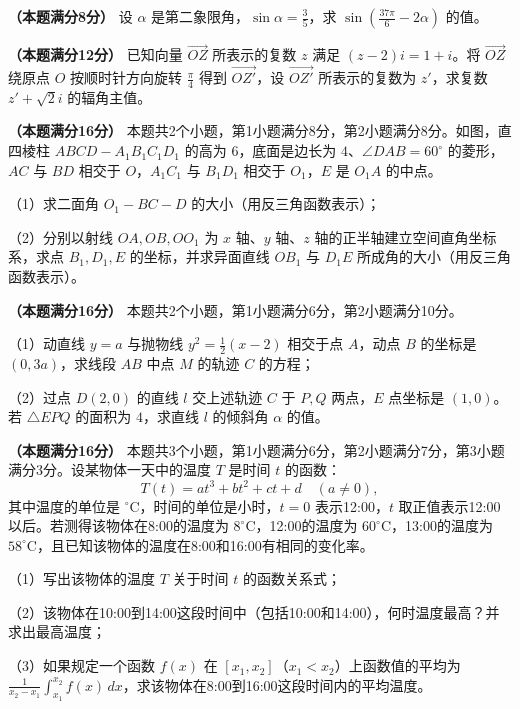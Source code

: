 \begin{question}
\textbf{（本题满分8分）} 设 $\alpha$ 是第二象限角，$\sin\alpha=\frac35$，求 $\sin\left(\frac{37\pi}{6}-2\alpha\right)$ 的值。

\end{question}
\begin{question}
\textbf{（本题满分12分）} 已知向量 $\overrightarrow{OZ}$ 所表示的复数 $z$ 满足 $(z-2)i=1+i$。将 $\overrightarrow{OZ}$ 绕原点 $O$ 按顺时针方向旋转 $\frac\pi4$ 得到 $\overrightarrow{OZ'}$，设 $\overrightarrow{OZ'}$ 所表示的复数为 $z'$，求复数 $z'+\sqrt2 i$ 的辐角主值。

\Needspace{0.4\textheight}
\end{question}
\begin{question}
\textbf{（本题满分16分）} 本题共2个小题，第1小题满分8分，第2小题满分8分。如图，直四棱柱 $ABCD-A_1B_1C_1D_1$ 的高为 $6$，底面是边长为 $4$、$\angle DAB=60^\circ$ 的菱形，$AC$ 与 $BD$ 相交于 $O$，$A_1C_1$ 与 $B_1D_1$ 相交于 $O_1$，$E$ 是 $O_1A$ 的中点。

（1）求二面角 $O_1-BC-D$ 的大小（用反三角函数表示）；

（2）分别以射线 $OA,OB,OO_1$ 为 $x$ 轴、$y$ 轴、$z$ 轴的正半轴建立空间直角坐标系，求点 $B_1,D_1,E$ 的坐标，并求异面直线 $OB_1$ 与 $D_1E$ 所成角的大小（用反三角函数表示）。
\nopagebreak[4]
\begin{center}\end{center}
\nopagebreak[4]
\end{question}
\begin{question}
\textbf{（本题满分16分）} 本题共2个小题，第1小题满分6分，第2小题满分10分。

（1）动直线 $y=a$ 与抛物线 $y^2=\frac12(x-2)$ 相交于点 $A$，动点 $B$ 的坐标是 $(0,3a)$，求线段 $AB$ 中点 $M$ 的轨迹 $C$ 的方程；

（2）过点 $D(2,0)$ 的直线 $l$ 交上述轨迹 $C$ 于 $P,Q$ 两点，$E$ 点坐标是 $(1,0)$。若 $\triangle EPQ$ 的面积为 $4$，求直线 $l$ 的倾斜角 $\alpha$ 的值。

\end{question}
\begin{question}
\textbf{（本题满分16分）} 本题共3个小题，第1小题满分6分，第2小题满分7分，第3小题满分3分。设某物体一天中的温度 $T$ 是时间 $t$ 的函数：
\nopagebreak[4]
\[
T(t)=at^3+bt^2+ct+d\quad(a\ne0),
\]
其中温度的单位是 $^\circ\mathrm C$，时间的单位是小时，$t=0$ 表示12:00，$t$ 取正值表示12:00以后。若测得该物体在8:00的温度为 $8^\circ\mathrm C$，12:00的温度为 $60^\circ\mathrm C$，13:00的温度为 $58^\circ\mathrm C$，且已知该物体的温度在8:00和16:00有相同的变化率。

（1）写出该物体的温度 $T$ 关于时间 $t$ 的函数关系式；

（2）该物体在10:00到14:00这段时间中（包括10:00和14:00），何时温度最高？并求出最高温度；

（3）如果规定一个函数 $f(x)$ 在 $[x_1,x_2]$（$x_1<x_2$）上函数值的平均为 $\frac1{x_2-x_1}\int_{x_1}^{x_2}f(x)\,dx$，求该物体在8:00到16:00这段时间内的平均温度。

\end{question}
